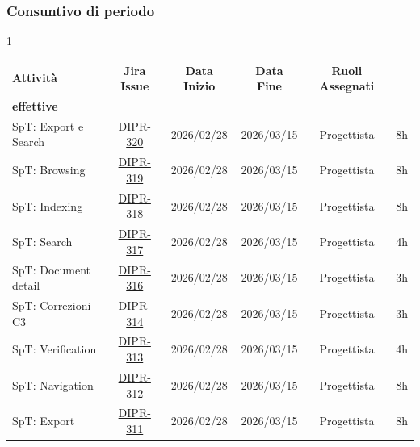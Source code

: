 \documentclass[a4paper,12pt]{article}
\begin{document}
\subsubsection{Consuntivo di periodo}
\begin{spacing}{1}
    \small
\begin{longtable}{|p{4cm}|c|c|c|c|c|}
        \hline
        \rowcolor{zpusgreen!30}
        \textbf{Attività} & \textbf{Jira Issue} & \textbf{Data Inizio} & \textbf{Data Fine} & \textbf{Ruoli Assegnati} & \begin{tabular}[c]{@{}c@{}} \textbf{Ore} \\ \textbf{effettive} \end{tabular} \\
        \hline
         [BACKEND] SpT: Export e Search & \href{https://7zpus.atlassian.net/browse/DIPR-320}{DIPR-320} & 2026/02/28 & 2026/03/15 & Progettista & 8h \\
        \hline
        [BACKEND] SpT: Browsing & \href{https://7zpus.atlassian.net/browse/DIPR-319}{DIPR-319} & 2026/02/28 & 2026/03/15 & Progettista & 8h \\
        \hline
        [BACKEND] SpT: Indexing & \href{https://7zpus.atlassian.net/browse/DIPR-318}{DIPR-318} & 2026/02/28 & 2026/03/15 & Progettista & 8h \\
        \hline
        [FRONTEND] SpT: Search & \href{https://7zpus.atlassian.net/browse/DIPR-317}{DIPR-317} & 2026/02/28 & 2026/03/15 & Progettista & 4h \\
        \hline
        [FRONTEND] SpT: Document detail & \href{https://7zpus.atlassian.net/browse/DIPR-316}{DIPR-316} & 2026/02/28 & 2026/03/15 & Progettista & 3h \\
        \hline
        [FRONTEND] SpT: Correzioni C3 & \href{https://7zpus.atlassian.net/browse/DIPR-314}{DIPR-314} & 2026/02/28 & 2026/03/15 & Progettista & 3h \\
        \hline
        [FRONTEND] SpT: Verification & \href{https://7zpus.atlassian.net/browse/DIPR-313}{DIPR-313} & 2026/02/28 & 2026/03/15 & Progettista & 4h \\
        \hline
        [FRONTEND] SpT: Navigation & \href{https://7zpus.atlassian.net/browse/DIPR-312}{DIPR-312} & 2026/02/28 & 2026/03/15 & Progettista & 8h \\
        \hline
        [FRONTEND] SpT: Export & \href{https://7zpus.atlassian.net/browse/DIPR-311}{DIPR-311} & 2026/02/28 & 2026/03/15 & Progettista & 8h \\
        \hline

\end{longtable}
\end{spacing}
\end{document}
